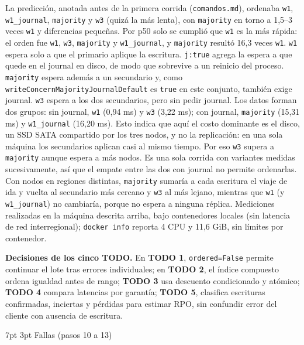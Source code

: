 \documentclass[10pt,letterpaper]{article}
\makeatletter
\renewcommand\section{\@startsection{section}{1}{\z@}%
  {7pt \@plus 2pt \@minus 1pt}{3pt}%
  {\normalfont\normalsize\bfseries\color{acc}}}
\makeatother
\begin{document}
La predicción, anotada antes de la primera corrida (\texttt{comandos.md}), ordenaba
\texttt{w1}, \texttt{w1\_journal}, \texttt{majority} y \texttt{w3} (quizá la más
lenta), con \texttt{majority} en torno a 1,5--3 veces \texttt{w1} y diferencias
pequeñas. Por p50 solo se cumplió que \texttt{w1} es la más rápida: el orden fue
\texttt{w1}, \texttt{w3}, \texttt{majority} y \texttt{w1\_journal}, y
\texttt{majority} resultó 16,3 veces \texttt{w1}. \texttt{w1} espera solo a que el
primario aplique la escritura. \texttt{j:true} agrega la espera a que quede en el
journal en disco, de modo que sobrevive a un reinicio del proceso. \texttt{majority}
espera además a un secundario y, como \texttt{writeConcernMajorityJournalDefault} es
\texttt{true} en este conjunto, también exige journal. \texttt{w3} espera a los dos
secundarios, pero sin pedir journal. Los datos forman dos grupos: sin journal,
\texttt{w1} (0,94 ms) y \texttt{w3} (3,22 ms); con journal, \texttt{majority} (15,31
ms) y \texttt{w1\_journal} (16,20 ms). Esto indica que aquí el costo dominante es el
disco, un SSD SATA compartido por los tres nodos, y no la replicación: en una sola
máquina los secundarios aplican casi al mismo tiempo. Por eso \texttt{w3} supera a
\texttt{majority} aunque espera a más nodos. Es una sola corrida con variantes medidas
sucesivamente, así que el empate entre las dos con journal no permite ordenarlas.
Con nodos en regiones distintas,
\texttt{majority} sumaría a cada escritura el viaje de ida y vuelta al secundario
más cercano y \texttt{w3} al más lejano, mientras que \texttt{w1} (y
\texttt{w1\_journal}) no cambiaría, porque no espera a ninguna réplica. Mediciones
realizadas en la máquina descrita arriba, bajo contenedores locales (sin latencia
de red interregional); \texttt{docker info} reporta 4 CPU y 11,6 GiB, sin límites por
contenedor.

\textbf{Decisiones de los cinco TODO.} En \textbf{TODO 1},
\texttt{ordered=False} permite continuar el lote tras errores individuales;
en \textbf{TODO 2}, el índice compuesto ordena igualdad antes de rango;
\textbf{TODO 3} usa descuento condicionado y atómico;
\textbf{TODO 4} compara latencias por garantía; \textbf{TODO 5}, clasifica escrituras confirmadas, inciertas y pérdidas para
estimar RPO, sin confundir error del cliente con ausencia de escritura.

\section{Fallas (pasos 10 a 13)}
\end{document}
